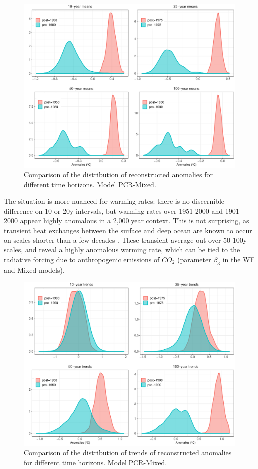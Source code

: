 \documentclass[12pt]{amsart}
\theoremstyle{plain}
\theoremstyle{definition}
\theoremstyle{remark}
\begin{document}
\begin{figure}
  \centering
  \includegraphics[scale=0.35]{compMeans}
  \caption{Comparison of the distribution of reconstructed anomalies for different time horizons. Model PCR-Mixed. }
  \label{fig:compmeans}
\end{figure}

The situation is more nuanced for warming rates: there is no discernible difference on 10 or 20y intervals, but warming rates over 1951-2000 and 1901-2000 appear highly anomalous in a 2,000 year context. This is not surprising, as transient heat exchanges between the surface and deep ocean are known to occur on scales shorter than a few decades \cite{Hansen:2005}. These transient average out over 50-100y scales, and reveal a highly anomalous warming rate, which can be tied to the radiative forcing due to anthropogenic emissions of $CO_2$ (parameter $\beta_3$ in the WF and Mixed models).

\begin{figure}
  \centering
  \includegraphics[scale=0.35]{compTrends}
  \caption{Comparison of the distribution of trends of reconstructed anomalies for different time horizons. Model PCR-Mixed.}
  \label{fig:comptrends}
\end{figure}
\end{document}
